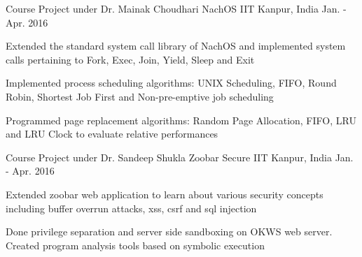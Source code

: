 \begin{cventries}
	\cventry
	{Course Project under Dr. Mainak Choudhari} %
	{NachOS} %
	{IIT Kanpur, India} %
	{Jan. - Apr. 2016} %
	{
		\begin{cvitems} %
			\item Extended the standard system call library of NachOS and implemented system calls pertaining to Fork, Exec, Join, Yield, Sleep and Exit
			\item Implemented process scheduling algorithms: UNIX Scheduling, FIFO, Round Robin, Shortest Job First and Non-pre-emptive job scheduling
			\item Programmed page replacement algorithms: Random Page Allocation, FIFO, LRU and LRU Clock to evaluate relative performances
		\end{cvitems}
	}
	\cventry
	{Course Project under Dr. Sandeep Shukla} %
	{Zoobar Secure} %
	{IIT Kanpur, India} %
	{Jan. - Apr. 2016} %
	{
		\begin{cvitems} %
			\item Extended zoobar web application to learn about various security concepts including buffer overrun attacks, xss, csrf and sql injection
			\item Done privilege separation and server side sandboxing on OKWS web server. Created program analysis tools based on symbolic execution
		\end{cvitems}
	}
	
	\iffalse
	\cventry
	{Subtitle Downloader} %
	{Open Source Projects} %
	{IIT Kanpur, India} %
	{Dec. 2013} %
	{
		\begin{cvitems} %
			\item Wrote a python script that scrapes and extract the subtitle from subscene.com.
		\end{cvitems}
	}
	
	\cventry
	{IITK FB Forum App} %
	{} %
	{} %
	{May 2014} %
	{
		\begin{cvitems} %
			\item Created an online discussion website for students and connected it with Facebook to make it more user friendly
			\item Used PHP and PostgreSQL for back-end and hosted application on Heroku. Used Facebook SDK for JavaScript for facebook login and Canvas frame for user interface
		\end{cvitems}
	}
	\fi
\end{cventries}